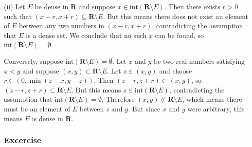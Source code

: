 (ii) Let $E$ be dense in $\mathbf{R}$ and suppose $x \in \text{int}(\mathbf{R} \setminus E)$. Then there exists $r > 0$ such that $(x-r, x+r) \subseteq
\mathbf{R} \setminus E$. 
But this means there does not exist an element of $E$ between any two numbers in $(x-r, x+r)$, contradicting the assumption that $E$ is a dense set.
We conclude that no such $x$ can be found, so $\text{int}(\mathbf{R} \setminus E) = \emptyset$.

Conversely, suppose $\text{int}(\mathbf{R} \setminus E) = \emptyset$. Let $x$ and $y$ be two real numbers satisfying $x < y$ and suppose $(x, y) \subset \mathbf{R} \setminus E$. Let $z \in (x, y)$ and choose $r \in (0, \min(z-x, y-z))$. Then $(z-r, z+r) \subset (x, y)$, so $(z-r, z+r) \subset \mathbf{R} \setminus E$. But this means $z \in \text{int}(\mathbf{R} \setminus E)$, contradicting the assumption that $\text{int}(\mathbf{R} \setminus E) = \emptyset$. Therefore $(x, y) \not\subset \mathbf{R} \setminus E$, which means there must be an element of $E$ between $z$ and $y$. But since $x$ and $y$ were arbitrary, this means $E$ is dense in $\mathbf{R}$.
\subsubsection{Excercise}